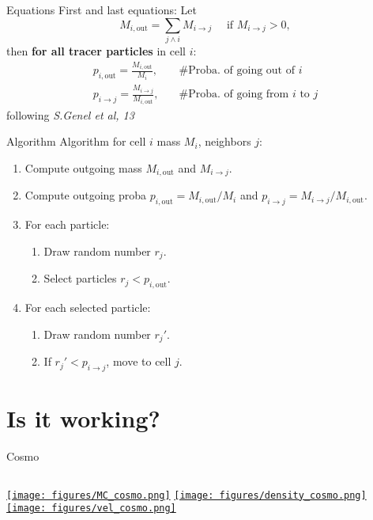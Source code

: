 \documentclass{beamer}
\begin{document}
\begin{frame}{Equations}
  First and last equations:
  Let
  \[ M_{i,\text{out}} = \sum_{j\wedge i} M_{i\rightarrow j} \quad \text{ if $M_{i\rightarrow j} > 0$},\]
  then \textbf{for all tracer particles} in cell \(i\):
  \begin{align}
    p_{i, \text{out}} = \frac{M_{i,\text{out}}}{M_i}, &
    \quad\text{\# Proba. of going out of $i$} \\
    p_{i\rightarrow j} = \frac{M_{i\rightarrow j}}{M_{i,\text{out}}}, &
    \quad\text{\# Proba. of going from $i$ to $j$}
  \end{align}
  following \emph{S.Genel et al, 13}
\end{frame}

\begin{frame}{Algorithm}
  Algorithm for cell $i$ mass $M_i$, neighbors $j$:
  \begin{enumerate}
  \item<1-> Compute outgoing mass $M_{i,\text{out}}$ and $M_{i\rightarrow j}$.
  \item<2-> Compute outgoing proba $p_{i,\text{out}}=M_{i,\text{out}}/M_i$
    and $p_{i\rightarrow j} = M_{i\rightarrow j}/M_{i,\text{out}}$.
  \item<3-> For each particle:
    \begin{enumerate}
    \item Draw random number $r_j$.
    \item Select particles $r_j < p_{i,\text{out}}$.
    \end{enumerate}
  \item<4-> For each selected particle:
    \begin{enumerate}
    \item Draw random number $r_j'$.
    \item If $r_j' < p_{i\rightarrow j}$, move to cell $j$.
    \end{enumerate}
  \end{enumerate}
\end{frame}
\section{Is it working?}
\begin{frame}{Cosmo}
  \begin{columns}
    \href{run:figures/MC_cosmo.avi?autostart&loop=false}{%
      \texttt{[image: figures/MC\_cosmo.png]}}
    \href{run:figures/density_cosmo.avi?autostart&loop=false}{%
      \texttt{[image: figures/density\_cosmo.png]}}
    \href{run:figures/vel_cosmo.avi?autostart&loop=false}{%
      \texttt{[image: figures/vel\_cosmo.png]}}
  \end{columns}
\end{frame}
\end{document}
